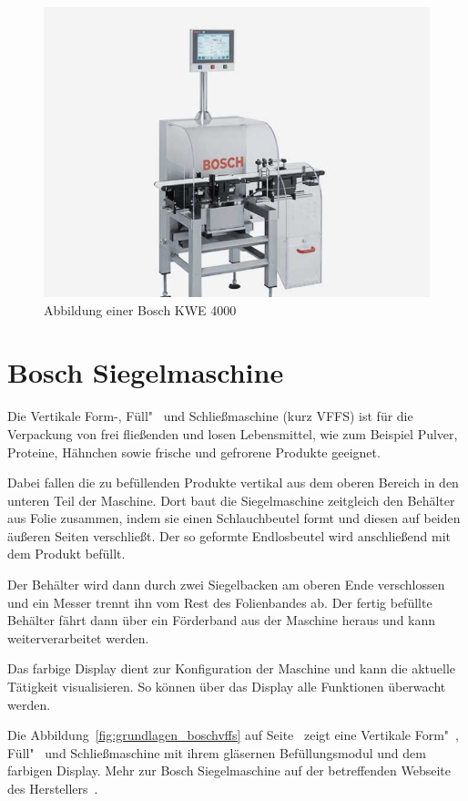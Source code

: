 \begin{figure}[h]
    \centering
    \includegraphics[scale=0.4]{images/kapitel_2/bosch_kwe.jpg}
    \caption{Abbildung einer Bosch KWE 4000}
    \label{fig:grundlagen_boschkwe}
\end{figure}

\section{Bosch Siegelmaschine}
Die Vertikale Form-, Füll"~ und Schließmaschine (kurz VFFS) ist für die Verpackung von  frei fließenden und losen
Lebensmittel, wie zum Beispiel Pulver, Proteine, Hähnchen sowie frische und gefrorene Produkte geeignet.

Dabei fallen die zu befüllenden Produkte vertikal aus dem oberen Bereich in den unteren Teil der Maschine. Dort baut
die Siegelmaschine zeitgleich den Behälter aus Folie zusammen, indem sie einen Schlauchbeutel formt und diesen auf
beiden äußeren Seiten verschließt. Der so geformte Endlosbeutel wird anschließend mit dem Produkt befüllt.

Der Behälter wird dann durch zwei Siegelbacken am oberen Ende verschlossen und ein Messer trennt ihn vom Rest des
Folienbandes ab. Der fertig befüllte Behälter fährt dann über ein Förderband aus der Maschine heraus und kann
weiterverarbeitet werden.

Das farbige Display dient zur Konfiguration der Maschine und kann die aktuelle Tätigkeit visualisieren. So können über
das Display alle Funktionen überwacht werden.

Die Abbildung~\ref{fig:grundlagen_boschvffs} auf Seite~\pageref{fig:grundlagen_boschvffs} zeigt eine Vertikale Form"~,
Füll"~ und Schließmaschine mit ihrem gläsernen Befüllungsmodul und dem farbigen Display. Mehr zur Bosch Siegelmaschine
auf der betreffenden Webseite des Herstellers~\cite{online_siegelmaschinen_vffs}.

